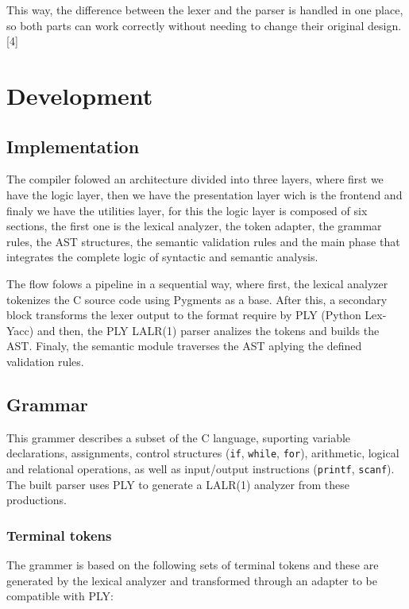\documentclass[letterpaper,12pt,oneside]{article}
\begin{document}
This way, the difference between the lexer and the parser is handled in one place, so both parts can work correctly without needing to change their original design. [4]


\section{Development}

\subsection{Implementation}

The compiler folowed an architecture divided into three layers, where first we have the logic layer, then we have the presentation layer wich is the frontend and finaly we have the utilities layer, for this the logic layer is composed of six sections, the first one is the lexical analyzer, the token adapter, the grammar rules, the AST structures, the semantic validation rules and the main phase that integrates the complete logic of syntactic and semantic analysis.

The flow folows a pipeline in a sequential way, where first, the lexical analyzer tokenizes the C source code using Pygments as a base. After this, a secondary block transforms the lexer output to the format require by PLY (Python Lex-Yacc) and then, the PLY LALR(1) parser analizes the tokens and builds the AST. Finaly, the semantic module traverses the AST aplying the defined validation rules.


\subsection{Grammar}

This grammer describes a subset of the C language, suporting variable declarations, assignments, control structures (\texttt{if}, \texttt{while}, \texttt{for}), arithmetic, logical and relational operations, as well as input/output instructions (\texttt{printf}, \texttt{scanf}). The built parser uses PLY to generate a LALR(1) analyzer from these productions.

\subsubsection{Terminal tokens}

The grammer is based on the following sets of terminal tokens and these are generated by the lexical analyzer and transformed through an adapter to be compatible with PLY:
\end{document}
